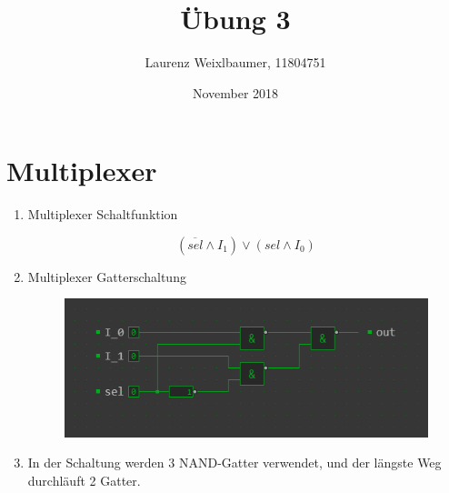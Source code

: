 \documentclass{article}
\title{Übung 3}
\author{Laurenz Weixlbaumer, 11804751}
\date{November 2018}
\begin{document}
\maketitle

\section{Multiplexer}

\begin{enumerate}[label=(\alph*)]

\item Multiplexer Schaltfunktion

$$
(\overline{sel} \land I_1) \lor (sel \land I_0)
$$

\addtocounter{enumi}{1}

\item Multiplexer Gatterschaltung

\begin{figure}[htp]
\includegraphics[width=\linewidth]{mux_circuit.png}
\end{figure}

\item In der Schaltung werden 3 NAND-Gatter verwendet, und der längste Weg durchläuft 2 Gatter.

\end{enumerate}
\end{document}
